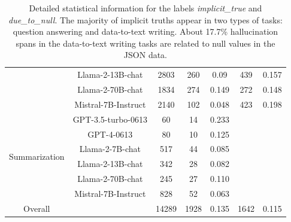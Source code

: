 \documentclass[11pt]{article}
\begin{document}
\begin{table}[h]
\begin{tabular}{c|cccccc}
                                      & Llama-2-13B-chat       & 2803                                   & 260              & 0.09            & 439             & 0.157           \\
                                      & Llama-2-70B-chat       & 1834                                   & 274              & 0.149           & 272             & 0.148           \\
                                      & Mistral-7B-Instruct    & 2140                                   & 102              & 0.048           & 423             & 0.198           \\
\midrule
\multirow{6}{*}{Summarization}        & GPT-3.5-turbo-0613     & 60                                     & 14               & 0.233           &                 &                 \\
                                      & GPT-4-0613             & 80                                     & 10               & 0.125           &                 &                 \\
                                      & Llama-2-7B-chat        & 517                                    & 44               & 0.085           &                 &                 \\
                                      & Llama-2-13B-chat       & 342                                    & 28               & 0.082           &                 &                 \\
                                      & Llama-2-70B-chat       & 245                                    & 27               & 0.110           &                 &                 \\
                                      & Mistral-7B-Instruct    & 828                                    & 52               & 0.063           &                 &                 \\
\midrule
Overall                               &                        & 14289                                  & 1928             & 0.135           & 1642                                                  & 0.115 \\
\bottomrule
\end{tabular}
\caption{Detailed statistical information for the labels \textit{implicit\_true} and \textit{due\_to\_null}. 
The majority of implicit truths appear in two types of tasks: question answering and data-to-text writing.
About 17.7\% hallucination spans in the data-to-text writing tasks are related to null values in the JSON data.}
\label{tab:implicit_true}
\end{table}
\end{document}
